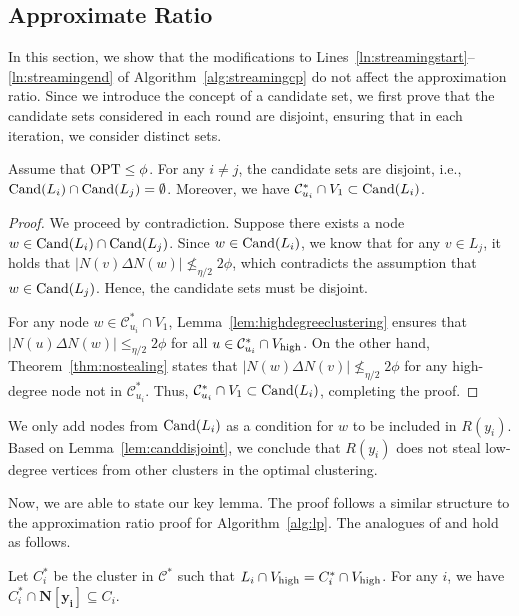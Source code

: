 \subsection{Approximate Ratio}

In this section, we show that the modifications to Lines~\ref{ln:streamingstart}--\ref{ln:streamingend} of Algorithm~\ref{alg:streamingcp} do not affect the approximation ratio. Since we introduce the concept of a candidate set, we first prove that the candidate sets considered in each round are disjoint, ensuring that in each iteration, we consider distinct sets.

\begin{lemma}
\label{lem:canddisjoint}
Assume that $\mathrm{OPT} \leq \phi$. For any $i \neq j$, the candidate sets are disjoint, i.e., $\mathrm{Cand}(L_i) \cap \mathrm{Cand}(L_j) = \emptyset$. Moreover, we have $\mathcal{C}^*_{u_i} \cap V_1 \subset \mathrm{Cand}(L_i)$.
\end{lemma}

\begin{proof}
We proceed by contradiction. Suppose there exists a node $w \in \mathrm{Cand}(L_i) \cap \mathrm{Cand}(L_j)$. Since $w \in \mathrm{Cand}(L_i)$, we know that for any $v \in L_j$, it holds that $|N(v) \Delta N(w)| \not\leq_{\eta / 2} 2\phi$, which contradicts the assumption that $w \in \mathrm{Cand}(L_j)$. Hence, the candidate sets must be disjoint.

For any node $w \in \mathcal{C}^*_{u_i} \cap V_1$, Lemma~\ref{lem:highdegreeclustering} ensures that $|N(u) \Delta N(w)| \leq_{\eta/2} 2\phi$ for all $u \in \mathcal{C}^*_{u_i} \cap V_{\operatorname{high}}$. On the other hand, Theorem~\ref{thm:nostealing} states that $|N(w) \Delta N(v)| \not\leq_{\eta/2} 2\phi$ for any high-degree node not in $\mathcal{C}^*_{u_i}$. Thus, $\mathcal{C}^*_{u_i} \cap V_1 \subset \mathrm{Cand}(L_i)$, completing the proof.
\end{proof}

We only add nodes from $\mathrm{Cand}(L_i)$ as a condition for $w$ to be included in $R(y_i)$. Based on Lemma~\ref{lem:canddisjoint}, we conclude that $R(y_i)$ does not steal low-degree vertices from other clusters in the optimal clustering. 

Now, we are able to state our key lemma. The proof follows a similar structure to the approximation ratio proof for Algorithm~\ref{alg:lp}. The analogues of  and  hold as follows.

\begin{lemma}\label{lem:inclusion2} 
Let $C^{*}_i$ be the cluster in $\mathcal{C}^{*}$ such that $L_i \cap V_{\operatorname{high}} = {C}^{*}_{i} \cap V_{\operatorname{high}}$. For any $i$, we have $C^{*}_i \cap \bm{N[y_i]} \subseteq C_i$. 
\end{lemma}

